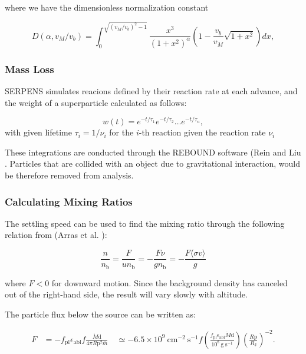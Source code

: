 \documentclass[journal,article,submit,pdftex,moreauthors]{Definitions/mdpi}
\begin{document}
where we have the dimensionless normalization constant

\begin{equation}
D\left(\alpha, v_M / v_b\right)=\int_0^{\sqrt{\left(v_M / v_b\right)^2-1}} \frac{x^3}{\left(1+x^2\right)^\alpha}\left(1-\frac{v_b}{v_M} \sqrt{1+x^2}\right) d x ,
\end{equation}

\subsubsection{Mass Loss}

SERPENS simulates reacions defined by their reaction rate at each advance, and the weight of a superparticle calculated as follows: 

\begin{equation}
   w(t)=e^{-t / \tau_1} e^{-t / \tau_2} \ldots e^{-t / \tau_n}, 
\end{equation}
with given lifetime $\tau_i=1 / \nu_i$ for the $i$-th reaction given the reaction rate $\nu_i$ \cite{Meyer_zu_Westram} 

These integrations are conducted through the REBOUND software (Rein and Liu \cite{Rein_Liu_2012}. Particles that are collided with an object due to gravitational interaction, would be therefore removed from analysis.

\subsubsection{Calculating Mixing Ratios}

The settling speed can be used to find the mixing ratio through the following relation from (Arras et al. \cite{Arras_2022}):

\begin{equation}
\frac{n}{n_{\mathrm{b}}} = \frac{F}{u n_{\mathrm{b}}} = -\frac{F \nu}{g n_{\mathrm{b}}} = -\frac{F\langle\sigma v\rangle}{g}
\end{equation}

where $F < 0$ for downward motion. Since the background density has canceled out of the right-hand side, the result will vary slowly with altitude.

The particle flux below the source can be written as:

\begin{equation}
\begin{aligned}
F & =-f_{\mathrm{pl}} \epsilon_{\mathrm{abl}} f \frac{\dot{M}{\mathrm{d}}}{4 \pi R{\mathrm{p}}^2 \bar{m}} \
& \simeq-6.5 \times 10^9 \mathrm{~cm}^{-2} \mathrm{~s}^{-1} f\left(\frac{f_{\mathrm{pl}} \epsilon_{\mathrm{abl}} \dot{M}{\mathrm{d}}}{10^8 \mathrm{~g} \mathrm{~s}^{-1}}\right)\left(\frac{R{\mathrm{p}}}{R_{\mathrm{J}}}\right)^{-2} .
\end{aligned}
\end{equation}
\end{document}
